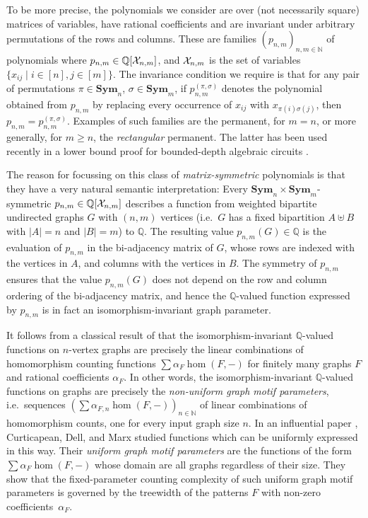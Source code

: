 \documentclass[11pt, DIV=15]{scrarticle}
\theoremstyle{definition}
\theoremstyle{plain}
\theoremstyle{remark}
\newcommand{\Xx}{{\cal X}}
\newcommand{\Sym}{\mathbf{Sym}}
\newcommand{\bbN}{\mathbb{N}}
\newcommand{\bbQ}{\mathbb{Q}}
\begin{document}
To be more precise, the polynomials we consider are over (not necessarily square) matrices of variables, have rational coefficients and are invariant under arbitrary permutations of the rows and columns.  These are families $(p_{n,m})_{n,m \in \bbN}$ of polynomials where $p_{n,m} \in \bbQ[\Xx_{n,m}]$, and $\Xx_{n,m}$ is the set of variables $\{x_{ij} \mid i \in [n], j \in [m]\}$.  The invariance condition we require is that for any pair of permutations $\pi \in \Sym_n$, $\sigma \in \Sym_m$, if $p_{n,m}^{(\pi,\sigma)}$ denotes the polynomial obtained from $p_{n,m}$ by replacing every occurrence of $x_{ij}$ with $x_{\pi(i)\sigma(j)}$, then $p_{n,m} = p_{n,m}^{(\pi,\sigma)}$. 
Examples of such families are the permanent, for $m = n$, or more generally, for $m \geq n$, the \emph{rectangular} permanent. The latter has been used recently in a lower bound proof for bounded-depth algebraic circuits \cite{forbes2024low}.

The reason for focussing on this class of \emph{matrix-symmetric} polynomials is that they have a very natural semantic interpretation: Every $\Sym_n \times \Sym_m$-symmetric $p_{n,m} \in \bbQ[\Xx_{n,m}]$ describes a function from weighted bipartite undirected graphs $G$ with $(n,m)$ vertices (i.e.\ $G$ has a fixed bipartition $A \uplus B$ with $|A| = n$ and $|B| = m$) to $\bbQ$. The resulting value $p_{n,m}(G) \in \bbQ$ is the evaluation of $p_{n,m}$ in the bi-adjacency matrix of $G$, whose rows are indexed with the vertices in $A$, and columns with the vertices in $B$. The symmetry of $p_{n,m}$ ensures that the value $p_{n,m}(G)$ does not depend on the row and column ordering of the bi-adjacency matrix, and hence the $\bbQ$-valued function expressed by $p_{n,m}$ is in fact an isomorphism-invariant graph parameter. 

It follows from a classical result of \textcite{lovasz_operations_1967} that the isomorphism-invariant $\mathbb{Q}$-valued functions on $n$-vertex graphs are precisely the linear combinations of homomorphism counting functions $\sum \alpha_F \hom(F, -)$ for finitely many graphs $F$ and rational coefficients $\alpha_F$. 
In other words,
the isomorphism-invariant $\mathbb{Q}$-valued functions on graphs are precisely the \emph{non-uniform graph motif parameters}, i.e.\ sequences $(\sum \alpha_{F, n} \hom(F, -))_{n \in \mathbb{N}}$ of linear combinations of homomorphism counts, one for every input graph size $n$.
In an influential paper \cite{curticapean_homomorphisms_2017}, Curticapean, Dell, and Marx 
studied functions which can be uniformly expressed in this way.
Their \emph{uniform graph motif parameters} are the functions of the form $\sum \alpha_F \hom(F, -)$ whose domain are all graphs regardless of their size.
They show that the fixed-parameter counting complexity of such uniform graph motif parameters is governed by the treewidth of the patterns $F$ with non-zero coefficients~$\alpha_F$.
\end{document}
